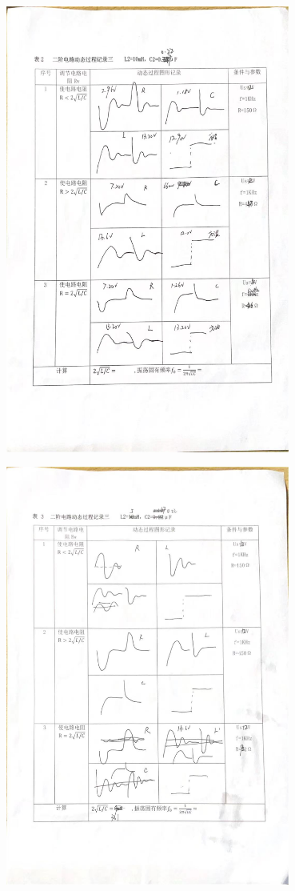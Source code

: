 \documentclass[a4paper,utf8]{article}
\begin{document}
    \begin{center}    
        \includegraphics[width=0.7\textwidth]{data2.jpg}
    \end{center}
    \begin{center}    
        \includegraphics[width=0.7\textwidth]{data3.jpg}
    \end{center}
    
\end{document}
